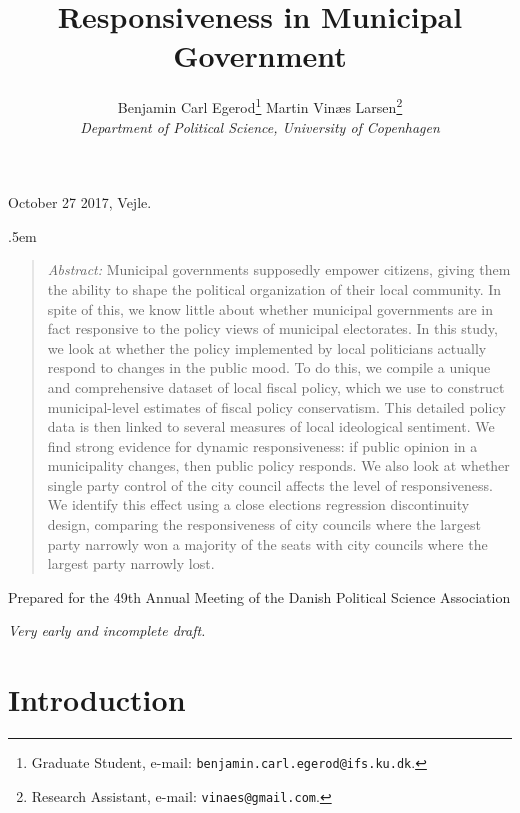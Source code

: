 \documentclass[a4paper,12pt]{article}
\title{\bigskip \bigskip \sffamily \LARGE Responsiveness in Municipal Government}
\author{\bigskip Benjamin Carl Egerod\footnote{Graduate Student, e-mail: \texttt{benjamin.carl.egerod@ifs.ku.dk}.} \qquad Martin Vinæs Larsen\footnote{Research Assistant, e-mail: \texttt{vinaes@gmail.com}.} \\ \textit{Department of Political Science, University of Copenhagen}} %
\makeatletter
\renewcommand{\maketitle}{
	\begin{flushleft}
		
		\onehalfspacing
		
		\@title
		
		\lineskip .5em
		\normalfont{\normalsize{\@author}}
\end{flushleft}}
\makeatother
\begin{document}
	
	\begin{footnotesize} \noindent October 27 2017, Vejle. \end{footnotesize} %
	
	\vspace{0.7in}
	
	\maketitle
	
	\bigskip
	
	\begin{quotation} %

		\small \noindent \emph{Abstract:} Municipal governments supposedly empower citizens, giving them the ability to shape the political organization of their local community. In spite of this, we know little about whether municipal governments are in fact responsive to the policy views of municipal electorates. In this study, we look at whether the policy implemented by local politicians actually respond to changes in the public mood. To do this, we compile a unique and comprehensive dataset of local fiscal policy, which we use to construct municipal-level estimates of fiscal policy conservatism. This detailed policy data is then linked to several measures of local ideological sentiment. We find strong evidence for dynamic responsiveness: if public opinion in a municipality changes, then public policy responds. We also look at whether single party control of the city council affects the level of responsiveness. We identify this effect using a close elections regression discontinuity design, comparing the responsiveness of city councils where the largest party narrowly won a majority of the seats with city councils where the largest party narrowly lost.
	\end{quotation}

\bigskip

\bigskip

\bigskip
	
	
	\noindent Prepared for the 49th Annual Meeting of the Danish Political Science Association \newline 
	
	\thispagestyle{empty} %
	
	
	\bigskip
	\noindent \textit{Very early and incomplete draft.}
	\bigskip
	\bigskip
	
	
	
\section{Introduction}
\end{document}

